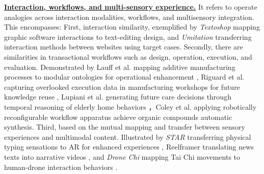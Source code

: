 \textbf{\underline{Interaction, workflows, and multi-sensory experience.}} It refers to operate analogies across interaction modalities, workflows, and multisensory integration. This encompasses: First, interaction similarity, exemplified by \textit{Textoshop} mapping graphic software interactions to text-editing design\cite{masson2025textoshop}, and \textit{Umitation} transferring interaction methods between websites using target cases\cite{chen2021umitation}. Secondly, there are similarities in transactional workflows such as design, operation, execution, and evaluation. Demonstrated by Lauff et al. mapping additive manufacturing processes to modular ontologies for operational enhancement \cite{hagedorn2018knowledge}, Riguard et al. capturing overlooked execution data in manufacturing workshops for future knowledge reuse \cite{rigaud2022exploring}, Lupiani et al. generating future care decisions through temporal reasoning of elderly home behaviors \cite{lupiani2017monitoring}，Coley et al. applying robotically reconfigurable workflow apparatus achieve organic compounds automatic synthesis\cite{coley2019robotic}. Third, based on the mutual mapping and transfer between sensory experiences and multimodal content. Illustrated by \textit{STAR }transferring physical typing sensations to AR for enhanced experiences \cite{kim2023star}, Reelframer translating news texts into narrative videos \cite{wang2024reelframer}, and \textit{Drone Chi} mapping Tai Chi movements to human-drone interaction behaviors \cite{la2020designing}.





